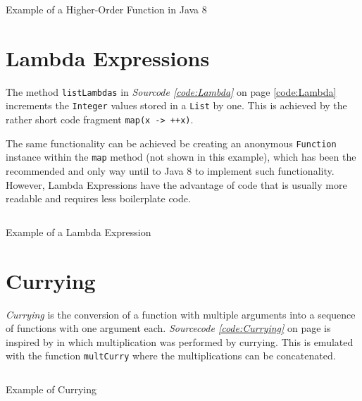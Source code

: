 \documentclass[a4paper,12pt,twoside]{scrreprt}
\begin{document}
\begin{listing}[ht]
    \inputminted[fontsize=\footnotesize,linenos,breaklines,breakanywhere]{java}{./code/HigherOrderFunctions.java}
    \caption[Example of a Higher-Order Function in Java 8]{Example of a Higher-Order Function in Java 8}
    \label{code:higherordered}
\end{listing}

\clearpage

\section{Lambda Expressions}
The method \texttt{listLambdas} in \textit{Sourcode \ref{code:Lambda}} on page \ref{code:Lambda} increments the \texttt{Integer} values stored in a \texttt{List} by one. This is achieved by the rather short code fragment \texttt{map(x -> ++x)}.

The same functionality can be achieved be creating an anonymous \texttt{Function} instance within the \texttt{map} method (not shown in this example), which has been the recommended and only way until to Java 8 to implement such functionality. However, Lambda Expressions have the advantage of code that is usually more readable and requires less boilerplate code.

\begin{listing}[ht]
    \inputminted[fontsize=\footnotesize,linenos]{java}{./code/LambdaExpressions.java}
    \caption[Example of a Lambda Expression]{Example of a Lambda Expression}
    \label{code:Lambda}
\end{listing}

\clearpage

\section{Currying}
\textit{Currying} is the conversion of a function with multiple arguments into a sequence of functions with one argument each. \textit{Sourcecode \ref{code:Currying}} on page \pageref{code:Currying} is inspired by \cite{Robertson_currying_2018} in which multiplication was performed by currying. This is emulated with the function \texttt{multCurry} where the multiplications can be concatenated.

\begin{listing}[ht]
    \inputminted[fontsize=\footnotesize,linenos,breaklines,breakanywhere]{java}{./code/Currying.java}
    \caption[Example of Currying]{Example of Currying}
    \label{code:Currying}
\end{listing}
\end{document}
